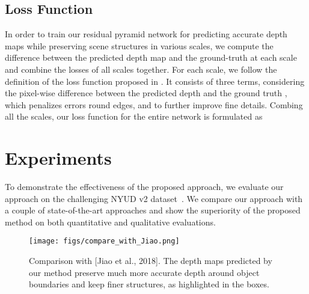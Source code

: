\documentclass{article}
\begin{document}
\subsection{Loss Function}
\label{sec:implementation}

In order to train our residual pyramid network for predicting accurate depth maps while preserving scene structures in various scales, we compute the difference between the predicted depth map  and the ground-truth  at each scale and combine the losses of all scales together. 
For each scale, we follow the definition of the loss function proposed in \cite{hu2019revisiting}. 
It consists of three terms,  considering the pixel-wise difference between the predicted depth  and the ground truth ,  which penalizes errors round edges, and  to further improve fine details. 
Combing all the  scales, our loss function for the entire network is formulated as 












 	\section{Experiments}
\label{sec:results}


To demonstrate the effectiveness of the proposed approach, we evaluate our approach on the challenging NYUD v2 dataset~\cite{silberman2012indoor}. We compare our approach with a couple of state-of-the-art approaches and show the superiority of the proposed method on both quantitative and qualitative evaluations.

\begin{figure}[ht]
	\centering
	\texttt{[image: figs/compare\_with\_Jiao.png]}
	\caption{Comparison with [Jiao et al., 2018]. The depth maps predicted by our method preserve much more accurate depth around object boundaries and keep finer structures, as highlighted in the boxes. }
	\label{fig:compare-jiao}
\end{figure}
\end{document}
